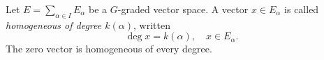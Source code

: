 Let $E = \sum_{\alpha \in I} E_{\alpha}$ be a $G$-graded vector space. A vector $x \in E_{\alpha}$ is called \textit{homogeneous of degree $k(\alpha)$}, written
$$\deg x = k(\alpha), \quad x \in E_{\alpha}.$$
The zero vector is homogeneous of every degree.
